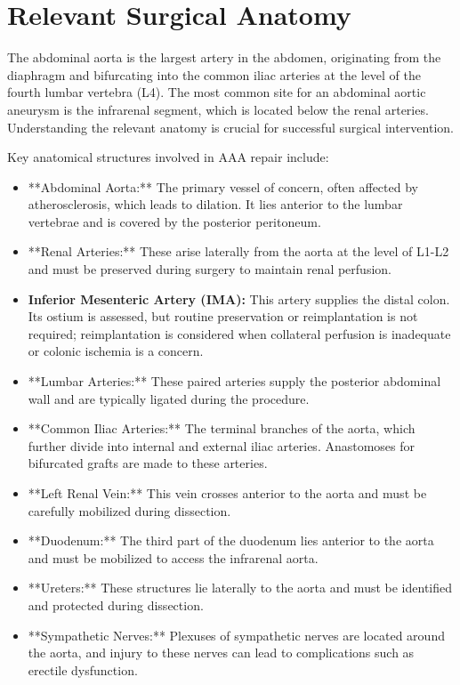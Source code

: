 \section*{Relevant Surgical Anatomy}
The abdominal aorta is the largest artery in the abdomen, originating from the diaphragm and bifurcating into the common iliac arteries at the level of the fourth lumbar vertebra (L4). The most common site for an abdominal aortic aneurysm is the infrarenal segment, which is located below the renal arteries. Understanding the relevant anatomy is crucial for successful surgical intervention.

Key anatomical structures involved in AAA repair include:

\begin{itemize}
  \item **Abdominal Aorta:** The primary vessel of concern, often affected by atherosclerosis, which leads to dilation. It lies anterior to the lumbar vertebrae and is covered by the posterior peritoneum.
  \item **Renal Arteries:** These arise laterally from the aorta at the level of L1-L2 and must be preserved during surgery to maintain renal perfusion.
  \item \textbf{Inferior Mesenteric Artery (IMA):} This artery supplies the distal colon. Its ostium is assessed, but routine preservation or reimplantation is not required; reimplantation is considered when collateral perfusion is inadequate or colonic ischemia is a concern.
  \item **Lumbar Arteries:** These paired arteries supply the posterior abdominal wall and are typically ligated during the procedure.
  \item **Common Iliac Arteries:** The terminal branches of the aorta, which further divide into internal and external iliac arteries. Anastomoses for bifurcated grafts are made to these arteries.
  \item **Left Renal Vein:** This vein crosses anterior to the aorta and must be carefully mobilized during dissection.
  \item **Duodenum:** The third part of the duodenum lies anterior to the aorta and must be mobilized to access the infrarenal aorta.
  \item **Ureters:** These structures lie laterally to the aorta and must be identified and protected during dissection.
  \item **Sympathetic Nerves:** Plexuses of sympathetic nerves are located around the aorta, and injury to these nerves can lead to complications such as erectile dysfunction.
\end{itemize}

